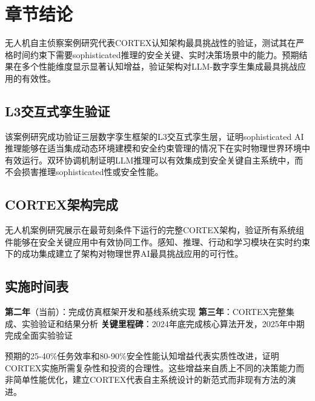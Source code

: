 \section{章节结论}

无人机自主侦察案例研究代表CORTEX认知架构最具挑战性的验证，测试其在严格时间约束下需要sophisticated推理的安全关键、实时决策场景中的能力。预期结果在多个性能维度显示显著认知增益，验证架构对LLM-数字孪生集成最具挑战应用的有效性。

\subsection{L3交互式孪生验证}

该案例研究成功验证三层数字孪生框架的L3交互式孪生层，证明sophisticated AI推理能够在适当集成动态环境建模和安全约束管理的情况下在实时物理世界环境中有效运行。双环协调机制证明LLM推理可以有效集成到安全关键自主系统中，而不会损害推理sophisticated性或安全性能。

\subsection{CORTEX架构完成}

无人机案例研究展示在最苛刻条件下运行的完整CORTEX架构，验证所有系统组件能够在安全关键应用中有效协同工作。感知、推理、行动和学习模块在实时约束下的成功集成建立了架构对物理世界AI最具挑战应用的可行性。

\subsection{实施时间表}

\textbf{第二年}（当前）：完成仿真框架开发和基线系统实现
\textbf{第三年}：CORTEX完整集成、实验验证和结果分析
\textbf{关键里程碑}：2024年底完成核心算法开发，2025年中期完成全面实验验证

预期的25-40\%任务效率和80-90\%安全性能认知增益代表实质性改进，证明CORTEX实施所需复杂性和投资的合理性。这些增益来自质上不同的决策能力而非简单性能优化，建立CORTEX代表自主系统设计的新范式而非现有方法的演进。 